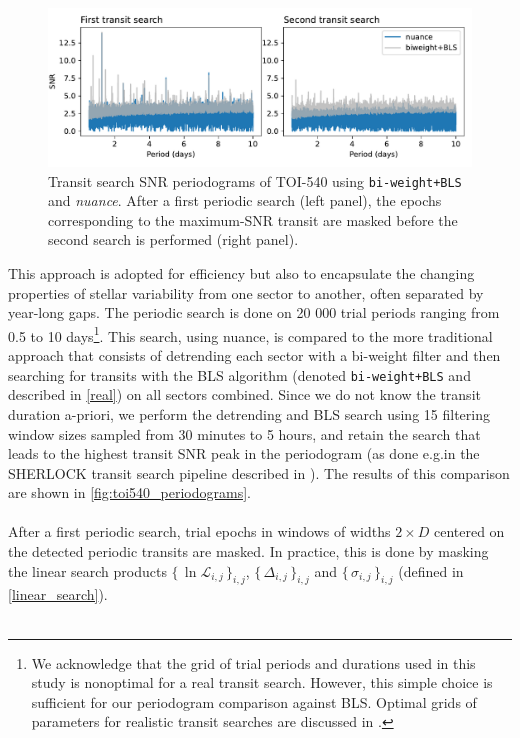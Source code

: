 \documentclass[modern,linenumbers]{aastex631}
\newcommand{\nuancemethod}{\textit{nuance}}
\newcommand{\nuance}{\nuancemethod{}}
\newcommand{\nuancecode}{\textsf{nuance}}
\newcommand{\set}[1]{\{\,#1\,\}}
\begin{document}
\begin{figure}[H]
    \begin{centering}
        \includegraphics[width=\linewidth]{../workflows/comparison_toi/figures/TOI 540/periodograms.pdf} 
        \caption{Transit search SNR periodograms of TOI-540 using \texttt{bi-weight+BLS} and \nuance{}. After a first periodic search (left panel), the epochs corresponding to the maximum-SNR transit are masked before the second search is performed (right panel).}
        \label{fig:toi540_periodograms}
    \end{centering}
\end{figure}
This approach is adopted for efficiency but also to encapsulate the changing properties of stellar variability from one sector to another, often separated by year-long gaps. The periodic search is done on 20 000 trial periods ranging from 0.5 to 10 days\footnote{We acknowledge that the grid of trial periods and durations used in this study is nonoptimal for a real transit search. However, this simple choice is sufficient for our periodogram comparison against BLS. Optimal grids of parameters for realistic transit searches are discussed in \cite{tls}.}. This search, using \nuancecode{}, is compared to the more traditional approach that consists of detrending each sector with a bi-weight filter and then searching for transits with the BLS algorithm (denoted \texttt{bi-weight+BLS} and described in \autoref{real}) on all sectors combined. Since we do not know the transit duration a-priori, we perform the detrending and BLS search using 15 filtering window sizes sampled from 30 minutes to 5 hours, and retain the search that leads to the highest transit SNR peak in the periodogram (as done e.g.\;in the SHERLOCK transit search pipeline described in \citealt{Pozuelos2020}). The results of this comparison are shown in \autoref{fig:toi540_periodograms}.\\\\
After a first periodic search, trial epochs in windows of widths $2\times D$ centered on the detected periodic transits are masked. In practice, this is done by masking the linear search products $\set{\ln\mathcal{L}_{i,j}}_{i, j}$, $\set{\Delta_{i,j}}_{i, j}$ and $\set{\sigma_{i,j}}_{i, j}$ (defined in \autoref{linear_search}).\\\\
\end{document}
